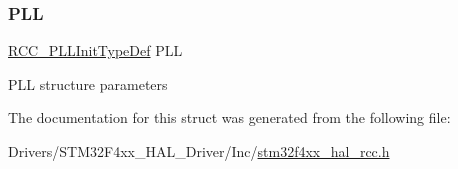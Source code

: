\subsubsection{\texorpdfstring{P\+LL}{PLL}}
{\footnotesize\ttfamily \mbox{\hyperlink{struct_r_c_c___p_l_l_init_type_def}{R\+C\+C\+\_\+\+P\+L\+L\+Init\+Type\+Def}} P\+LL}

P\+LL structure parameters 

The documentation for this struct was generated from the following file\+:\begin{DoxyCompactItemize}
\item 
Drivers/\+S\+T\+M32\+F4xx\+\_\+\+H\+A\+L\+\_\+\+Driver/\+Inc/\mbox{\hyperlink{stm32f4xx__hal__rcc_8h}{stm32f4xx\+\_\+hal\+\_\+rcc.\+h}}\end{DoxyCompactItemize}
